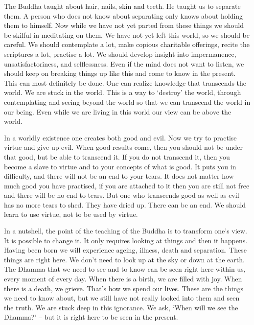 The Buddha taught about hair, nails, skin and teeth. He taught us to separate them. A person who does not know about separating only knows about holding them to himself. Now while we have not yet parted from these things we should be skilful in meditating on them. We have not yet left this world, so we should be careful. We should contemplate a lot, make copious charitable offerings, recite the scriptures a lot, practise a lot. We should develop insight into impermanence, unsatisfactoriness, and selflessness. Even if the mind does not want to listen, we should keep on breaking things up like this and come to know in the present. This can most definitely be done. One can realize knowledge that transcends the world. We are stuck in the world. This is a way to `destroy' the world, through contemplating and seeing beyond the world so that we can transcend the world in our being. Even while we are living in this world our view can be above the world.

In a worldly existence one creates both good and evil. Now we try to practise virtue and give up evil. When good results come, then you should not be under that good, but be able to transcend it. If you do not transcend it, then you become a slave to virtue and to your concepts of what is good. It puts you in difficulty, and there will not be an end to your tears. It does not matter how much good you have practised, if you are attached to it then you are still not free and there will be no end to tears. But one who transcends good as well as evil has no more tears to shed. They have dried up. There can be an end. We should learn to use virtue, not to be used by virtue.

In a nutshell, the point of the teaching of the Buddha is to transform one's view. It is possible to change it. It only requires looking at things and then it happens. Having been born we will experience ageing, illness, death and separation. These things are right here. We don't need to look up at the sky or down at the earth. The Dhamma that we need to see and to know can be seen right here within us, every moment of every day. When there is a birth, we are filled with joy. When there is a death, we grieve. That's how we spend our lives. These are the things we need to know about, but we still have not really looked into them and seen the truth. We are stuck deep in this ignorance. We ask, `When will we see the Dhamma?' -- but it is right here to be seen in the present.


